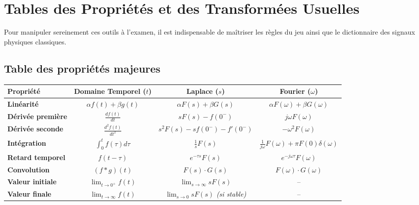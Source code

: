 \documentclass[11pt,a4paper]{report}
\begin{document}
\section{Tables des Propriétés et des Transformées Usuelles}

Pour manipuler sereinement ces outils à l'examen, il est indispensable de maîtriser les règles du jeu ainsi que le dictionnaire des signaux physiques classiques.

\subsection{Table des propriétés majeures}
\begin{center}
\small
\begin{tabular}{|l|c|c|c|}
\hline
\textbf{Propriété} & \textbf{Domaine Temporel} ($t$) & \textbf{Laplace} ($s$) & \textbf{Fourier} ($\omega$) \\ \hline
\textbf{Linéarité} & $\alpha f(t) + \beta g(t)$ & $\alpha F(s) + \beta G(s)$ & $\alpha F(\omega) + \beta G(\omega)$ \\ \hline
\textbf{Dérivée première} & $\frac{df(t)}{dt}$ & $s F(s) - f(0^-)$ & $j\omega F(\omega)$ \\ \hline
\textbf{Dérivée seconde} & $\frac{d^2f(t)}{dt^2}$ & $s^2 F(s) - s f(0^-) - f'(0^-)$ & $-\omega^2 F(\omega)$ \\ \hline
\textbf{Intégration} & $\int_{0}^{t} f(\tau) d\tau$ & $\frac{1}{s} F(s)$ & $\frac{1}{j\omega} F(\omega) + \pi F(0)\delta(\omega)$ \\ \hline
\textbf{Retard temporel} & $f(t - \tau)$ & $e^{-\tau s} F(s)$ & $e^{-j\omega \tau} F(\omega)$ \\ \hline
\textbf{Convolution} & $(f * g)(t)$ & $F(s) \cdot G(s)$ & $F(\omega) \cdot G(\omega)$ \\ \hline
\textbf{Valeur initiale} & $\lim_{t \to 0^+} f(t)$ & $\lim_{s \to \infty} s F(s)$ & -- \\ \hline
\textbf{Valeur finale} & $\lim_{t \to \infty} f(t)$ & $\lim_{s \to 0} s F(s)$ \textit{(si stable)} & -- \\ \hline
\end{tabular}
\end{center}
\end{document}
